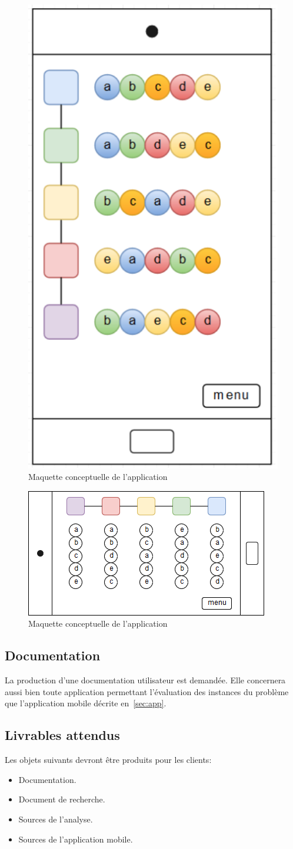 \documentclass[a4paper, 11pt, titlepage]{article}
\begin{document}
\begin{appendix}
	\begin{figure}[h!]
		\centering
		\includegraphics[width=0.3\linewidth]{maquette.png}
		\caption{Maquette conceptuelle de l'application}
		\label{fig:mockup1}
	\end{figure}
	
	\begin{figure}[h!]
		\centering
		\includegraphics[width=0.7\linewidth]{maquette2.png}
		\caption{Maquette conceptuelle de l'application}
		\label{fig:mockup2}
	\end{figure}
	
\subsection{Documentation}
La production d’une documentation utilisateur est demandée. Elle concernera aussi bien toute application permettant l’évaluation des instances du problème que l’application mobile décrite en~\ref{sec:app}.
\subsection{Livrables attendus}
Les objets suivants devront être produits pour les clients:
	\begin{itemize}
		\item Documentation.
		\item Document de recherche.
		\item Sources de l’analyse.
		\item Sources de l’application mobile.
	\end{itemize}

\end{appendix}
\end{document}
